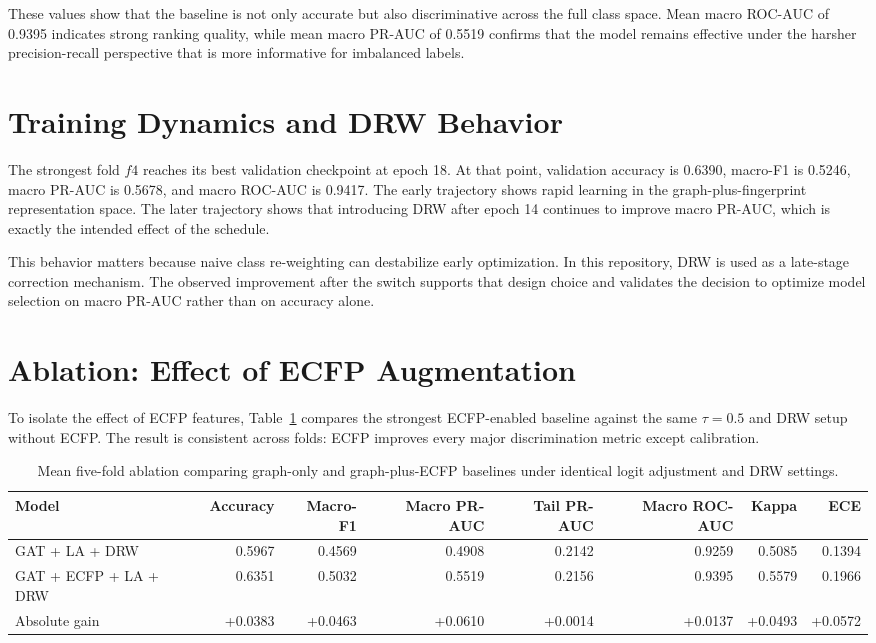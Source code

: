 \documentclass[12pt,a4paper]{report}
\begin{document}
These values show that the baseline is not only accurate but also discriminative across the full class space. Mean macro ROC-AUC of 0.9395 indicates strong ranking quality, while mean macro PR-AUC of 0.5519 confirms that the model remains effective under the harsher precision-recall perspective that is more informative for imbalanced labels.

\section{Training Dynamics and DRW Behavior}
The strongest fold \(f4\) reaches its best validation checkpoint at epoch 18. At that point, validation accuracy is 0.6390, macro-F1 is 0.5246, macro PR-AUC is 0.5678, and macro ROC-AUC is 0.9417. The early trajectory shows rapid learning in the graph-plus-fingerprint representation space. The later trajectory shows that introducing DRW after epoch 14 continues to improve macro PR-AUC, which is exactly the intended effect of the schedule.

This behavior matters because naive class re-weighting can destabilize early optimization. In this repository, DRW is used as a late-stage correction mechanism. The observed improvement after the switch supports that design choice and validates the decision to optimize model selection on macro PR-AUC rather than on accuracy alone.

\section{Ablation: Effect of ECFP Augmentation}
To isolate the effect of ECFP features, Table~\ref{tab:ecfp_ablation} compares the strongest ECFP-enabled baseline against the same \(\tau = 0.5\) and DRW setup without ECFP. The result is consistent across folds: ECFP improves every major discrimination metric except calibration.

\begin{table}[H]
\centering
\caption{Mean five-fold ablation comparing graph-only and graph-plus-ECFP baselines under identical logit adjustment and DRW settings.}
\label{tab:ecfp_ablation}
\begin{tabular}{lrrrrrrr}
\toprule
Model & Accuracy & Macro-F1 & Macro PR-AUC & Tail PR-AUC & Macro ROC-AUC & Kappa & ECE \\
\midrule
GAT + LA + DRW & 0.5967 & 0.4569 & 0.4908 & 0.2142 & 0.9259 & 0.5085 & 0.1394 \\
GAT + ECFP + LA + DRW & 0.6351 & 0.5032 & 0.5519 & 0.2156 & 0.9395 & 0.5579 & 0.1966 \\
\midrule
Absolute gain & +0.0383 & +0.0463 & +0.0610 & +0.0014 & +0.0137 & +0.0493 & +0.0572 \\
\bottomrule
\end{tabular}
\end{table}
\end{document}
